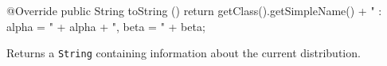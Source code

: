\begin{hide}\begin{code}

   @Override
   public String toString () {
      return getClass().getSimpleName() + " : alpha = " + alpha + ", beta = " + beta;
   }
\end{code}
\begin{tabb}
   Returns a \texttt{String} containing information about the current distribution.
\end{tabb}\end{hide}
\begin{code}\begin{hide}
}\end{hide}
\end{code}
